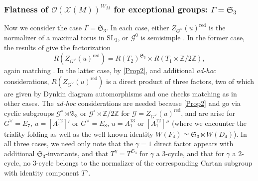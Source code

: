 \documentclass[10pt]{article}
\newcommand{\X}{\mathcal{X}}
\newcommand{\Gg}{\mathcal{G}}
\newcommand{\Z}{\mathbb{Z}}
\newcommand{\Oo}{\mathcal{O}}
\newcommand{\SL}{\mathrm{SL}}
\newcommand{\Sn}{\mathfrak{S}}
\newcommand{\An}{\mathfrak{A}}
\theoremstyle{definition}
\theoremstyle{remark}
\newcommand{\Zur}{Z_{G^\vee}(u)^{\mathrm{red}}}
\newcommand{\Zz}{\mathcal{G}}
\begin{document}
\subsubsection{Flatness of $\Oo(\X(M))^{W_M}$ for exceptional groups: $\Gamma=\Sn_3$}
\label{subsubsection flatness of X(M)/WM exceptional S3}
Now we consider the case $\Gamma=\Sn_3$.
In each case, either 
$\Zur$ is the normalizer of a maximal torus in $\SL_3$, or $\Zz^0$ is semisimple \cite{Ale79}. In the former case, the 
results of \cite{MatsTaka} give the factorization 
%
\[
R(\Zur)=R(T_2)^{\Sn_3}\times R(T_1\times\Z/2\Z),
\]
%
again matching \cite{Howlett}. In the latter case, by \ref{Prop2}, and additional \textit{ad-hoc} considerations, $R(\Zur)$ is a direct product of three factors, two of which are given by Dynkin diagram automorphisms and one checks matching as in other cases. The \textit{ad-hoc} considerations are needed because \ref{Prop2} and \cite{diss} go via cyclic subgroups $\Gg^\circ\rtimes\An_3$ or $\Gg^\circ\rtimes\Z/2\Z$ for $\Gg=\Zur$, and are arise for $G^\vee=E_7$, $u=[A^{12}_1]'$ or $G^\vee=E_8$, $u=A_1^{13}$ or $[A_1^{12}]''$ (where we encounter the triality folding
as well as the well-known identity $W(F_4)\simeq\Sn_3\ltimes W(D_4)$). In all three cases, we need only note that the $\gamma=1$ direct factor appears with additional $\Sn_3$-invariants, and that $T^{\gamma}=T^{\Sn_3}$ for $\gamma$ a 3-cycle, and that for $\gamma$ a $2$-cycle, no $3$-cycle belongs to the normalizer of the corresponding Cartan subgroup with identity component $T^\gamma$.
\end{document}
